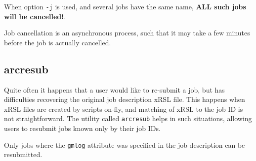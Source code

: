 When option \verb#-j# is used, and several jobs have the same name,
\textbf{ALL such jobs will be cancelled!}.

\begin{framed}
   Job cancellation is an asynchronous process, such that it
   may take a few minutes before the job is actually cancelled.
\end{framed}

\subsection{arcresub}
\label{sec:arcresub}

Quite often it happens that a user would like to re-submit a job, but
has difficulties recovering the original job description xRSL file.
This happens when xRSL files are created by scripts on-fly, and
matching of xRSL to the job ID is not straightforward. The utility
called \texttt{arcresub} helps
in such situations, allowing users to resubmit jobs known only by
their job IDs.

\begin{framed}
   Only jobs where the \verb#gmlog# attribute was
   specified in the job description can be resubmitted.
\end{framed}

